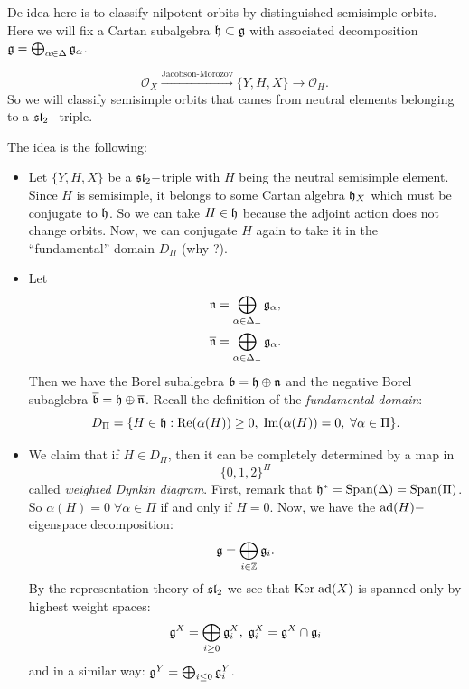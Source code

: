 De idea here is to classify nilpotent orbits by distinguished semisimple orbits. Here we will fix 
a Cartan subalgebra $\mathfrak{h}\subset \mathfrak{g}$ with associated decomposition $\mathfrak{g}=\bigoplus_{\alpha\in\Delta}\mathfrak{g}_\alpha$.

\begin{equation}
    \mathcal{O}_X\overset{\text{Jacobson-Morozov}}{\longrightarrow}\{Y,H,X\}\to\mathcal{O}_H.
\end{equation}
So we will classify semisimple orbits that cames from neutral elements belonging to a $\mathfrak{sl}_2-$triple. 

The idea is the following:
\begin{itemize}
    \item Let $\{Y,H,X\}$ be a $\mathfrak{sl}_2-$triple with $H$ being the neutral semisimple element. Since $H$ is semisimple, it 
    belongs to some Cartan algebra $\mathfrak{h}_X$ which must be conjugate to $\mathfrak{h}$. So we can take $H\in\mathfrak{h}$ because the 
    adjoint action does not change orbits. Now, we can conjugate $H$ again to take it in the ``fundamental'' 
    domain $D_\Pi$ (why ?).
    \item Let 
    \begin{equation}
        \begin{split}
            &\mathfrak{n}=\bigoplus_{\alpha\in\Delta_+}\mathfrak{g}_\alpha,\\
            &\overline{\mathfrak{n}}=\bigoplus_{\alpha\in\Delta_-}\mathfrak{g}_\alpha.
        \end{split}
    \end{equation}
    Then we have the Borel subalgebra $\mathfrak{b}=\mathfrak{h}\oplus \mathfrak{n}$ and the negative Borel 
    subaglebra $\overline{\mathfrak{b}}=\mathfrak{h}\oplus \overline{\mathfrak{n}}$. Recall the definition of the 
    \textit{fundamental domain}:
    \begin{equation}
        D_\Pi=\{H\in\mathfrak{h}: \text{Re}(\alpha(H))\geq0,\;\text{Im}(\alpha(H))=0,\;\forall\alpha\in\Pi\}.
    \end{equation}
    
    \item We claim that if $H\in D_\Pi$, then it can be completely determined by a map in
    \begin{equation}
        \{0,1,2\}^\Pi
    \end{equation}
    called \textit{weighted Dynkin diagram}. First, 
    remark that $\mathfrak{h}^*=\text{Span}(\Delta)=\text{Span}(\Pi)$. So $\alpha(H)=0\;\forall\alpha\in \Pi$ if and 
    only if $H=0$. Now, we have the $\text{ad}(H)-$eigenspace decomposition:
    \begin{equation}
        \mathfrak{g}=\bigoplus_{i\in\mathbb{Z}}\mathfrak{g}_i.
    \end{equation}
    By the representation theory of $\mathfrak{sl}_2$ we see that $\text{Ker}\;\text{ad}(X)$ is spanned only by highest weight spaces:
    \begin{equation}
        \mathfrak{g}^X=\bigoplus_{i\geq0}\mathfrak{g}_i^X,\;\mathfrak{g}_i^X=\mathfrak{g}^X\cap\mathfrak{g}_i
    \end{equation}
    and in a similar way: $\mathfrak{g}^Y=\bigoplus_{i\leq0}\mathfrak{g}_i^Y$.



\end{itemize}
